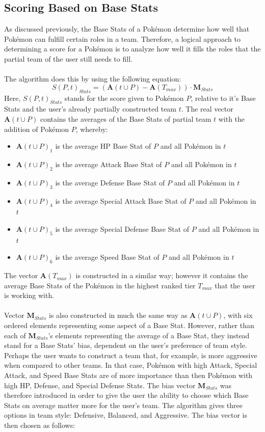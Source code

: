 \documentclass{article}
\begin{document}
\subsection{Scoring Based on Base Stats}\label{scoringBaseStats}
As discussed previously, the Base Stats of a Pok\'emon determine how well that Pok\'emon can fulfill certain roles in a team. Therefore, a logical approach to determining a score for a Pok\'emon is to analyze how well it fills the roles that the partial team of the user still needs to fill.\\\\
The algorithm does this by using the following equation:
\begin{equation}\label{statsScoreEqn}
	S(P,t)_{Stats}=(\textbf{A}(t\cup P)-\textbf{A}(T_{max}))\cdot\textbf{M}_{Stats}
\end{equation}
Here, $S(P,t)_{Stats}$ stands for the score given to Pok\'emon $P$, relative to it's Base Stats and the user's already partially constructed team $t$. The real vector $\textbf{A}(t\cup P)$ contains the averages of the Base Stats of partial team $t$ with the addition of Pok\'emon $P$, whereby:
\begin{itemize}
	\item $\textbf{A}(t\cup P)_1$ is the average HP Base Stat of $P$ and all Pok\'emon in $t$
	\item $\textbf{A}(t\cup P)_2$ is the average Attack Base Stat of $P$ and all Pok\'emon in $t$
	\item $\textbf{A}(t\cup P)_3$ is the average Defense Base Stat of $P$ and all Pok\'emon in $t$
	\item $\textbf{A}(t\cup P)_4$ is the average Special Attack Base Stat of $P$ and all Pok\'emon in $t$
	\item $\textbf{A}(t\cup P)_5$ is the average Special Defense Base Stat of $P$ and all Pok\'emon in $t$
	\item $\textbf{A}(t\cup P)_6$ is the average Speed Base Stat of $P$ and all Pok\'emon in $t$
\end{itemize}
The vector $\textbf{A}(T_{max})$ is constructed in a similar way; however it contains the average Base Stats of the Pok\'emon in the highest ranked tier $T_{max}$ that the user is working with.\\\\
Vector $\textbf{M}_{Stats}$ is also constructed in much the same way as $\textbf{A}(t\cup P)$, with six ordered elements representing some aspect of a Base Stat. However, rather than each of $\textbf{M}_{Stats}$'s elements representing the average of a Base Stat, they instead stand for a Base Stats' bias, dependent on the user's preference of team style. Perhaps the user wants to construct a team that, for example, is more aggressive when compared to other teams. In that case, Pok\'emon with high Attack, Special Attack, and Speed Base Stats are of more importance than then Pok\'emon with high HP, Defense, and Special Defense Stats. The bias vector $\textbf{M}_{Stats}$ was therefore introduced in order to give the user the ability to choose which Base Stats on average matter more for the user's team. The algorithm gives three options in team style: Defensive, Balanced, and Aggressive. The bias vector is then chosen as follows:
\end{document}
